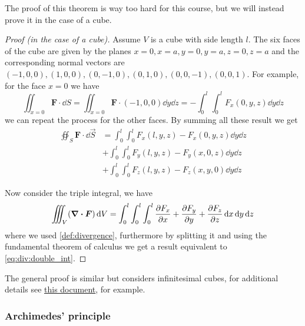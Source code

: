 \documentclass[12pt]{extarticle}
\begin{document}
The proof of this theorem is way too hard for this course, but we will instead prove it in the case of a cube.
\begin{proof}[Proof (in the case of a cube)]
    Assume $V$ is a cube with side length $l$.
    The six faces of the cube are given by the planes $x=0, x=a, y=0, y=a, z=0, z=a$ and the corresponding normal vectors are $(-1,0,0), (1,0,0), (0,-1,0), (0,1,0), (0,0,-1), (0,0,1)$.
    For example, for the face $x = 0$ we have
    \begin{equation}
        \iint_{x = 0} \bm{F} \cdot \dd{S} = \iint_{x = 0} \bm{F} \cdot (-1, 0, 0) \dd{y} \dd{z} = - \int_0^l \int_0^l F_x(0, y, z) \dd{y} \dd{z}
    \end{equation}
    we can repeat the process for the other faces. By summing all these result we get
    \begin{equation}
        \label{eq:div:double_int}
        \begin{split}
            \oiint_{S} \bm{F} \cdot \dd{\vec S} & = \int_0^l \int_0^l F_x(l, y, z)-F_x(0, y, z) \dd{y} \dd{z} \\
                                                & + \int_0^l \int_0^l F_y(l, y, z)-F_y(x, 0, z) \dd{y} \dd{z} \\
                                                & + \int_0^l \int_0^l F_z(l, y, z)-F_z(x, y, 0) \dd{y} \dd{z}
        \end{split}
    \end{equation}

    Now consider the triple integral, we have
    \begin{equation}
        \iiint_V (\div \bm{F}) \dd{V} = \int_0^l \int_0^l \int_0^l \pdv{F_x}{x} + \pdv{F_y}{y} + \pdv{F_z}{z} \dd{x} \dd{y} \dd{z}
    \end{equation}
    where we used \autoref{def:divergence}, furthermore by splitting it and using the fundamental theorem of calculus we get a result equivalent to \autoref{eq:div:double_int}.
\end{proof}

The general proof is similar but considers infinitesimal cubes, for additional details see \href{https://people.math.harvard.edu/~knill/teaching/summer2011/handouts/64-divergence.pdf}{this document}, for example.

\subsubsection{Archimedes' principle}
\end{document}
